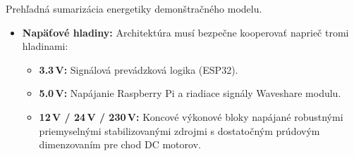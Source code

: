 Prehľadná sumarizácia energetiky demonštračného modelu.
\begin{itemize}
    \item \textbf{Napäťové hladiny:} Architektúra musí bezpečne kooperovať naprieč tromi hladinami:
    \begin{itemize}
        \item \textbf{3.3\,V:} Signálová prevádzková logika (ESP32).
        \item \textbf{5.0\,V:} Napájanie Raspberry Pi a riadiace signály Waveshare modulu.
        \item \textbf{12\,V / 24\,V / 230\,V:} Koncové výkonové bloky napájané robustnými priemyselnými stabilizovanými zdrojmi s dostatočným prúdovým dimenzovaním pre chod DC motorov.
    \end{itemize}
\end{itemize}
